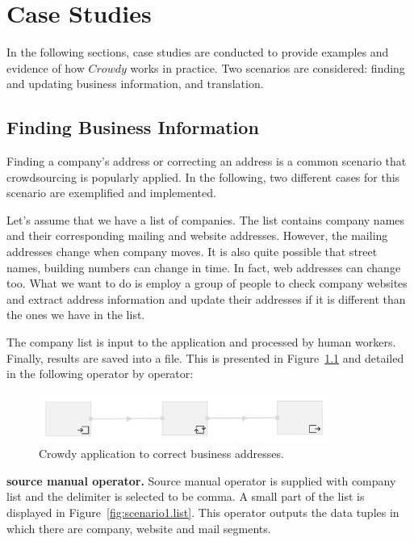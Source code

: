 \chapter{Case Studies}
\label{chap:examples}

In the following sections, case studies are conducted to provide examples 
and evidence of how $Crowdy$ works in practice. Two scenarios are considered: 
finding and updating business information, and translation.

\section{Finding Business Information}
Finding a company's address or correcting an address is a common scenario that crowdsourcing is popularly applied. In the following, two different cases for this scenario are exemplified and implemented.

Let's assume that we have a list of companies. The list contains company names and their corresponding mailing and website addresses. However, the mailing addresses change when company moves. It is also quite possible that street names, building numbers can change in time. In fact, web addresses can change too. What we want to do is employ a group of people to check company websites and extract address information and update their addresses if it is different than the ones we have in the list.

The company list is input to the application and processed by human workers. Finally, results are saved into a file. This is presented in Figure~\ref{fig:scenario1} and detailed in the following operator by operator:

\begin{figure}[ht]
	\centering
	\includegraphics[width=0.85\textwidth]{figures/scenarios/naive.png}
	\caption{Crowdy application to correct business addresses.}
	\label{fig:scenario1}
\end{figure}

\textbf{source manual operator.}
Source manual operator is supplied with company list and the delimiter is selected to be comma. A small part of the list is displayed in Figure~\ref{fig:scenario1.list}. This operator outputs the data tuples in which there are company, website and mail segments.

